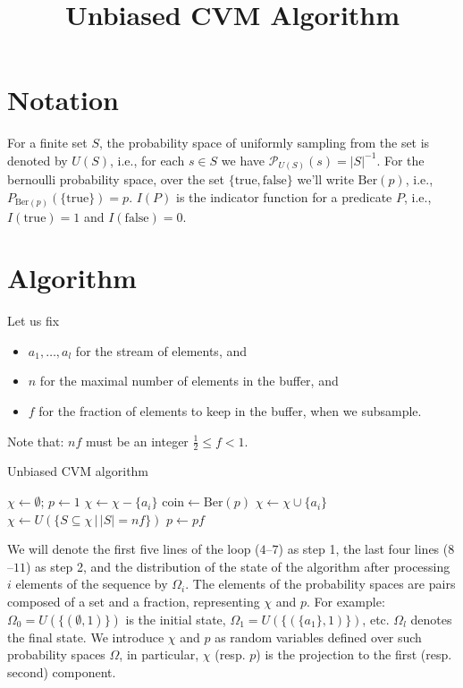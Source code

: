 \documentclass{article}
\newcommand{\prob}{\mathcal P}
\theoremstyle{definition}
\begin{document}
\title{Unbiased CVM Algorithm}
\maketitle
\section{Notation}
For a finite set $S$, the probability space of uniformly sampling from the set is denoted by $U(S)$, i.e., for each $s \in S$ we have
$\prob_{U(S)}({s}) = |S|^{-1}$.
For the bernoulli probability space, over the set $\{\mathrm{true},\mathrm{false}\}$ we'll write $\mathrm{Ber}(p)$, i.e., $P_{\mathrm{Ber}(p)}(\{\mathrm{true}\}) = p$.
$I(P)$ is the indicator function for a predicate $P$, i.e., $I(\mathrm{true}) = 1$ and $I(\mathrm{false}) = 0$.
\section{Algorithm}
Let us fix
\begin{itemize}
  \item $a_1,\ldots,a_l$ for the stream of elements, and
  \item $n$ for the maximal number of elements in the buffer, and
  \item $f$ for the fraction of elements to keep in the buffer, when we subsample.
\end{itemize}
Note that: $nf$ must be an integer $\frac{1}{2} \leq f < 1$.

\begin{algorithm}
\caption{Unbiased CVM algorithm}
\begin{algorithmic}[1]
\State $\chi \gets \emptyset$; $p \gets 1$
  \State $\chi \gets \chi - \{a_i\}$
  \State $\mathrm{coin} \gets \mathrm{Ber}(p)$
    \State $\chi \gets \chi \cup \{a_i\}$
  \EndIf
    \State $\chi \gets U(\{ S \subseteq \chi \,|\, |S|=nf \})$
    \State $p \gets p f$
  \EndIf
\EndFor
\State {}
\end{algorithmic}
\end{algorithm}

We will denote the first five lines of the loop ($4$--$7$) as step 1, the last four lines ($8$--$11$) as step 2, and the distribution of the state of the algorithm after processing $i$ elements of the sequence by $\Omega_i$.
The elements of the probability spaces are pairs composed of a set and a fraction, representing $\chi$ and $p$.
For example: $\Omega_0 = U(\{(\emptyset, 1)\})$ is the initial state, $\Omega_1 = U(\{(\{a_1\}, 1)\})$, etc. $\Omega_l$ denotes the final state.
We introduce $\chi$ and $p$ as random variables defined over such probability spaces $\Omega$, in particular, $\chi$ (resp. $p$) is the projection to the first (resp. second) component.
\end{document}
